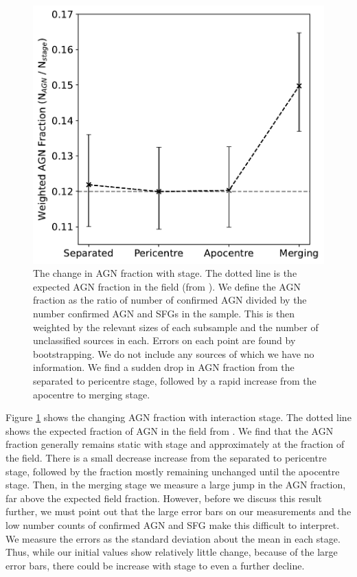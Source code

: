 \begin{figure}
    \centering
    \includegraphics[width=\textwidth]{Chapter3/figures/agn-frac-time.pdf}
    \caption[The change in AGN fraction with stage.]{The change in AGN fraction with stage. The dotted line is the expected AGN fraction in the field (from \citet{2008AJ....135.1877E}). We define the AGN fraction as the ratio of number of confirmed AGN divided by the number confirmed AGN and SFGs in the sample. This is then weighted by the relevant sizes of each subsample and the number of unclassified sources in each. Errors on each point are found by bootstrapping. We do not include any sources of which we have no information. We find a sudden drop in AGN fraction from the separated to pericentre stage, followed by a rapid increase from the apocentre to merging stage.}
    \label{fig:agn-frac-time}
\end{figure}

Figure \ref{fig:agn-frac-time} shows the changing AGN fraction with interaction stage. The dotted line shows the expected fraction of AGN in the field from \citet{2008AJ....135.1877E}. We find that the AGN fraction generally remains static with stage and approximately at the fraction of the field. There is a small decrease increase from the separated to pericentre stage, followed by the fraction mostly remaining unchanged until the apocentre stage. Then, in the merging stage we measure a large jump in the AGN fraction, far above the expected field fraction. However, before we discuss this result further, we must point out that the large error bars on our measurements and the low number counts of confirmed AGN and SFG make this difficult to interpret. We measure the errors as the standard deviation about the mean in each stage. Thus, while our initial values show relatively little change, because of the large error bars, there could be increase with stage to even a further decline.


